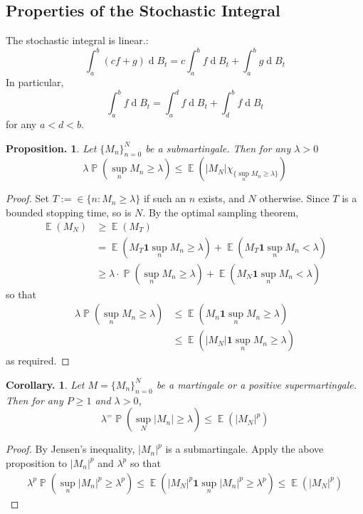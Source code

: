 \documentclass[11pt, a4paper]{memoir}
\theoremstyle{change}
\newtheorem{corollary}[theorem]{Corollary.}
\newtheorem{proposition}[theorem]{Proposition.}
\theoremstyle{plain}
\theoremstyle{nonumberplain}
\newtheorem{proof}{Proof}
\DeclareMathOperator{\pr}{{\mathbb{P}}}
\DeclareMathOperator{\E}{{\mathbb{E}}}
\renewcommand{\d}[1]{\ensuremath{\operatorname{d}\!{#1}}}
\newcommand{\idc}{\mathbf{1}}
\numberwithin{equation}{section}
\begin{document}
\subsection{Properties of the Stochastic Integral}
The stochastic integral is linear.:
\begin{equation*}
    \int_a^b(cf+g)\d{B_t} = c\int_a^b f\d{B_t}+\int_a^b g\d{B_t}
\end{equation*}
In particular,
\begin{equation*}
    \int_a^b f\d{B_t}=\int_a^df\d{B_t}+\int_d^bf\d{B_t}
\end{equation*}
for any $a<d<b$.
\begin{proposition}
    Let $\{M_n\}_{n=0}^N$ be a submartingale.
    Then for any $\lambda>0$
    \begin{equation*}
        \lambda\pr(\sup_n M_n\geq\lambda)\leq\E(|M_N|\chi_{\{\sup_n M_n\geq\lambda\}})
    \end{equation*}
\end{proposition}
\begin{proof}
    Set $T:=\in\{n:M_n\geq\lambda\}$ if such an $n$ exists, and $N$ otherwise.
    Since $T$ is a bounded stopping time, so is $N$.
    By the optimal sampling theorem,
    \begin{align*}
        \E(M_N)&\geq\E(M_T)\\
               &= \E(M_T\idc{\sup_n M_n\geq\lambda})+\E(M_T\idc{\sup_n M_n<\lambda})\\
               &\geq \lambda\cdot\pr(\sup_n M_n\geq\lambda)+\E(M_N\idc{\sup_n M_n<\lambda})
    \end{align*}
    so that
    \begin{align*}
        \lambda\pr(\sup_n M_n\geq\lambda) &\leq\E(M_n\idc{\sup_n M_n\geq\lambda})\\
                                          &\leq\E(|M_N|\idc{\sup_n M_n\geq\lambda})
    \end{align*}
    as required.
\end{proof}
\begin{corollary}
    Let $M=\{M_n\}_{n=0}^N$ be a martingale or a positive supermartingale.
    Then for any $P\geq 1$ and $\lambda>0$,
    \begin{equation*}
        \lambda^=\pr(\sup_N|M_n|\geq\lambda)\leq\E(|M_N|^p)
    \end{equation*}
\end{corollary}
\begin{proof}
    By Jensen's inequality, $|M_n|^p$ is a submartingale.
    Apply the above proposition to $|M_n|^p$ and $\lambda^p$ so that
    \begin{align*}
        \lambda^p\pr(\sup_n|M_n|^p\geq\lambda^p)\leq\E(|M_N|^p\idc{\sup_n|M_n|^p\geq\lambda^p})\leq\E(|M_N|^p)
    \end{align*}
\end{proof}
\end{document}
